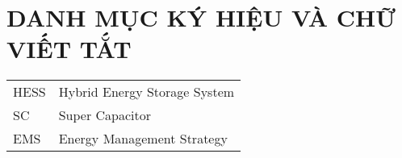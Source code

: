 \tableofcontents 
    \thispagestyle{empty}
        \newpage

\section*{DANH MỤC KÝ HIỆU VÀ CHỮ VIẾT TẮT}
     {}

\begin{tabular}{ l l }
    \hspace{1cm} HESS & \hspace{4cm} Hybrid Energy Storage System \\  
    \hspace{1cm} SC & \hspace{4cm} Super Capacitor    \\
    \hspace{1cm} EMS  & \hspace{4cm} Energy Management Strategy 
\end{tabular}  
    \newpage

{\let\oldnumberline\numberline
    \renewcommand{\numberline}{Hình~\oldnumberline}
        \listoffigures}
\newpage

{\let\oldnumberline\numberline
    \renewcommand{\numberline}{Bảng~\oldnumberline}
        \listoftables}
